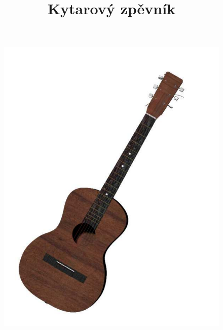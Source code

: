 \documentclass[a4paper, 12pt, twoside]{article}
\title{\Huge \bf Kytarový zpěvník}
\author{}
\begin{document}
\begin{titlepage}
	\begin{figure}[ht]
	\begin{center}
		\includegraphics[scale=0.3,angle=10]{kytara.pdf}
		\maketitle
	\end{center}
	\end{figure}		
\end{titlepage}


\newpage
\thispagestyle{empty}
\tableofcontents

\setcounter{page}{0}
\pagestyle{plain}



%

%
\end{document}
